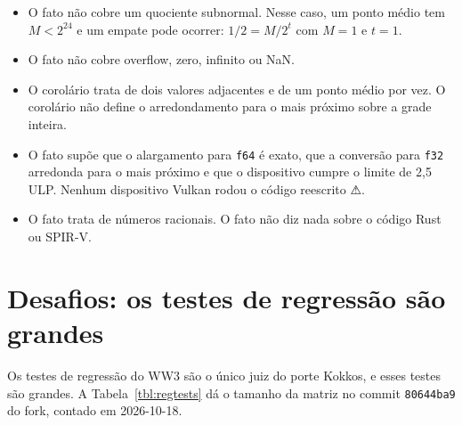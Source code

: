 \documentclass[10pt,a4paper,]{article}
\providecommand{\tightlist}{\setlength{\itemsep}{0pt}\setlength{\parskip}{0pt}}
\begin{document}
\begin{itemize}
\tightlist
\item
  O fato não cobre um quociente subnormal. Nesse caso, um ponto médio
  tem \(M < 2^{24}\) e um empate pode ocorrer: \(1/2 = M/2^{t}\) com
  \(M = 1\) e \(t = 1\).
\item
  O fato não cobre overflow, zero, infinito ou NaN.
\item
  O corolário trata de dois valores adjacentes e de um ponto médio por
  vez. O corolário não define o arredondamento para o mais próximo sobre
  a grade inteira.
\item
  O fato supõe que o alargamento para \texttt{f64} é exato, que a
  conversão para \texttt{f32} arredonda para o mais próximo e que o
  dispositivo cumpre o limite de 2,5 ULP. Nenhum dispositivo Vulkan
  rodou o código reescrito ⚠.
\item
  O fato trata de números racionais. O fato não diz nada sobre o código
  Rust ou SPIR-V.
\end{itemize}

\section{Desafios: os testes de regressão são
grandes}\label{sec:challenges}

Os testes de regressão do WW3 são o único juiz do porte Kokkos, e esses
testes são grandes. A Tabela~\ref{tbl:regtests} dá o tamanho da matriz
no commit \texttt{80644ba9} do fork, contado em 2026-10-18.
\end{document}
